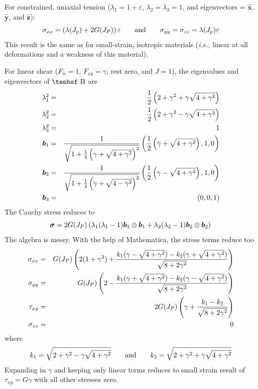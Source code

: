 \documentclass[11pt]{book}
\renewcommand{\vec}[1]{\boldsymbol{#1}}
\newcommand{\tens}[1]{\boldsymbol{\mathsf{#1}}}
\def\B{\hbox{\tenbsf B}}
\begin{document}
For constrained, uniaxial tension ($\lambda_1=1+\varepsilon$, $\lambda_2=\lambda_3=1$, and eigenvectors = $\hat{\vec x}$, $\hat{\vec y}$, and $\hat{\vec z}$):
\begin{equation}
      \sigma_{xx} =  \left(\lambda(J_p) + 2G(J_P) \right)\varepsilon \qquad{\rm and}\qquad \sigma_{yy}=\sigma_{zz}=\lambda(J_p)\varepsilon
\end{equation}
This result is the same as for small-strain, isotropic materials (\emph{i.e.}, linear at all deformations and a weakness of this material).

For linear shear ($F_{ii}=1$. $F_{xy}=\gamma$, rest zero, and $J=1$), the eigenvalues and eigenvectors of $\B$ are
\begin{eqnarray}
      \lambda_1^2 & = & {1\over2}\left(2+\gamma^2+\gamma\sqrt{4+\gamma^2}\right)  \\
      \lambda_2^2 & = & {1\over2}\left(2+\gamma^2-\gamma\sqrt{4+\gamma^2}\right)  \\
      \lambda_3^2 & = & 1  \\
      \vec b_1 & = &{1\over \sqrt{1+{1\over4}\left(\gamma+\sqrt{4+\gamma^2}\right)^2}} \left({1\over2}\left(\gamma+\sqrt{4+\gamma^2}\right),1,0\right) \\
      \vec b_2 & = &{1\over \sqrt{1+{1\over4}\left(\gamma+\sqrt{4-\gamma^2}\right)^2}} \left({1\over2}\left(\gamma-\sqrt{4+\gamma^2}\right),1,0\right) \\
      \vec b_3 & = & \left(0,0,1\right) 
\end{eqnarray}
The Cauchy stress reduces to
\begin{equation}
   \tens\sigma = 2G(J_P)  \left(  \lambda_1(\lambda_1-1) \vec b_1\otimes\vec b_1 + \lambda_2(\lambda_2-1) \vec b_2\otimes\vec b_2\right) \\
\end{equation}
The algebra is messy. With the help of Mathematica, the stress terms reduce too
\begin{eqnarray}
    \sigma_{xx} & = & G(J_P)\left(2(1+\gamma^2)+{k_1(\gamma-\sqrt{4+\gamma^2})-k_2(\gamma+\sqrt{4+\gamma^2})\over \sqrt{8+2\gamma^2}}\right) \\
    \sigma_{yy} & = & G(J_P)\left(2-{k_1(\gamma+\sqrt{4+\gamma^2})-k_2(\gamma-\sqrt{4+\gamma^2})\over \sqrt{8+2\gamma^2}}\right) \\
    \tau_{xy} & = & 2G(J_P) \left(\gamma+{k_1-k_2\over \sqrt{8+2\gamma^2}}\right) \\
    \sigma_{zz} & = & 0
\end{eqnarray}
where
\begin{equation}
    k_1 = \sqrt{2+\gamma^2-\gamma\sqrt{4+\gamma^2}} \qquad {\rm and} \qquad
    k_2 = \sqrt{2+\gamma^2+\gamma\sqrt{4+\gamma^2}}
\end{equation}
Expanding in $\gamma$ and keeping only linear terms reduces to small strain result of $\tau_{xy} =G\gamma$ with all other stresses zero.
\end{document}
